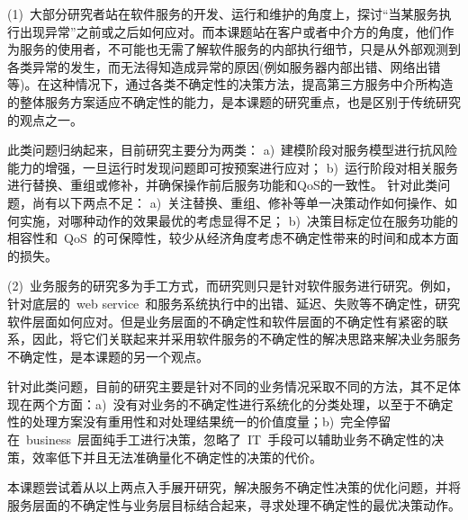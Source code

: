 (1)~大部分研究者站在软件服务的开发、运行和维护的角度上，探讨“当某服务执行出现异常”之前或之后如何应对。而本课题站在客户或者中介方的角度，他们作为服务的使用者，不可能也无需了解软件服务的内部执行细节，只是从外部观测到各类异常的发生，而无法得知造成异常的原因(例如服务器内部出错、网络出错等)。在这种情况下，通过各类不确定性的决策方法，提高第三方服务中介所构造的整体服务方案适应不确定性的能力，是本课题的研究重点，也是区别于传统研究的观点之一。

此类问题归纳起来，目前研究主要分为两类：
a)~建模阶段对服务模型进行抗风险能力的增强，一旦运行时发现问题即可按预案进行应对；
b)~运行阶段对相关服务进行替换、重组或修补，并确保操作前后服务功能和QoS的一致性。
针对此类问题，尚有以下两点不足：
a)~关注替换、重组、修补等单一决策动作如何操作、如何实施，对哪种动作的效果最优的考虑显得不足；
b)~决策目标定位在服务功能的相容性和~QoS~的可保障性，较少从经济角度考虑不确定性带来的时间和成本方面的损失。

(2)~业务服务的研究多为手工方式，而研究则只是针对软件服务进行研究。例如，针对底层的~web service~和服务系统执行中的出错、延迟、失败等不确定性，研究软件层面如何应对。但是业务层面的不确定性和软件层面的不确定性有紧密的联系，因此，将它们关联起来并采用软件服务的不确定性的解决思路来解决业务服务不确定性，是本课题的另一个观点。

针对此类问题，目前的研究主要是针对不同的业务情况采取不同的方法，其不足体现在两个方面：a)~没有对业务的不确定性进行系统化的分类处理，以至于不确定性的处理方案没有重用性和对处理结果统一的价值度量；b)~完全停留在~business~层面纯手工进行决策，忽略了~IT~手段可以辅助业务不确定性的决策，效率低下并且无法准确量化不确定性的决策的代价。

本课题尝试着从以上两点入手展开研究，解决服务不确定性决策的优化问题，并将服务层面的不确定性与业务层目标结合起来，寻求处理不确定性的最优决策动作。




